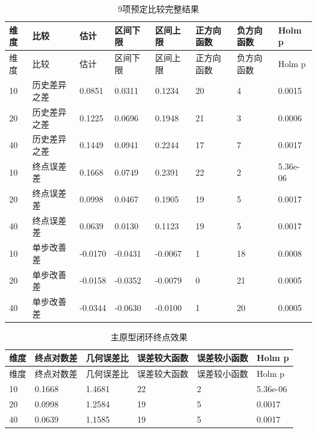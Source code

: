 \documentclass[11pt,a4paper]{article}
\begin{document}
\par\noindent\begin{minipage}{\linewidth}

\begin{longtable}[]{@{}llllllll@{}}
\caption{9项预定比较完整结果}\tabularnewline
\toprule
维度 & 比较 & 估计 & 区间下限 & 区间上限 & 正方向函数 & 负方向函数 &
Holm p \\
\midrule
\endfirsthead
\toprule
维度 & 比较 & 估计 & 区间下限 & 区间上限 & 正方向函数 & 负方向函数 &
Holm p \\
\midrule
\endhead
10 & 历史差异之差 & 0.0851 & 0.0311 & 0.1234 & 20 & 4 & 0.0015 \\
20 & 历史差异之差 & 0.1225 & 0.0696 & 0.1948 & 21 & 3 & 0.0006 \\
40 & 历史差异之差 & 0.1449 & 0.0941 & 0.2244 & 17 & 7 & 0.0017 \\
10 & 终点误差差 & 0.1668 & 0.0749 & 0.2391 & 22 & 2 & 5.36e-06 \\
20 & 终点误差差 & 0.0998 & 0.0467 & 0.1905 & 19 & 5 & 0.0017 \\
40 & 终点误差差 & 0.0639 & 0.0130 & 0.1123 & 19 & 5 & 0.0017 \\
10 & 单步改善差 & -0.0170 & -0.0431 & -0.0067 & 1 & 18 & 0.0008 \\
20 & 单步改善差 & -0.0158 & -0.0352 & -0.0079 & 0 & 21 & 0.0005 \\
40 & 单步改善差 & -0.0344 & -0.0630 & -0.0100 & 1 & 20 & 0.0005 \\
\bottomrule
\end{longtable}

\end{minipage}\par

\par\noindent\begin{minipage}{\linewidth}

\begin{longtable}[]{@{}llllll@{}}
\caption{主原型闭环终点效果}\tabularnewline
\toprule
维度 & 终点对数差 & 几何误差比 & 误差较大函数 & 误差较小函数 & Holm p \\
\midrule
\endfirsthead
\toprule
维度 & 终点对数差 & 几何误差比 & 误差较大函数 & 误差较小函数 & Holm p \\
\midrule
\endhead
10 & 0.1668 & 1.4681 & 22 & 2 & 5.36e-06 \\
20 & 0.0998 & 1.2584 & 19 & 5 & 0.0017 \\
40 & 0.0639 & 1.1585 & 19 & 5 & 0.0017 \\
\bottomrule
\end{longtable}

\end{minipage}\par
\end{document}
